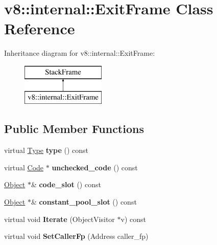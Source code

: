 \hypertarget{classv8_1_1internal_1_1_exit_frame}{}\section{v8\+:\+:internal\+:\+:Exit\+Frame Class Reference}
\label{classv8_1_1internal_1_1_exit_frame}
Inheritance diagram for v8\+:\+:internal\+:\+:Exit\+Frame\+:\begin{figure}[H]
\begin{center}
\leavevmode
\includegraphics[height=2.000000cm]{classv8_1_1internal_1_1_exit_frame}
\end{center}
\end{figure}
\subsection*{Public Member Functions}
\begin{DoxyCompactItemize}
\item 
\hypertarget{classv8_1_1internal_1_1_exit_frame_aa8e1ddd656c8fa0057a4a0a682252625}{}virtual \hyperlink{classv8_1_1internal_1_1_type_impl}{Type} {\bfseries type} () const \label{classv8_1_1internal_1_1_exit_frame_aa8e1ddd656c8fa0057a4a0a682252625}

\item 
\hypertarget{classv8_1_1internal_1_1_exit_frame_a65d3f3b3cc9a22462c134e09bad7e8b3}{}virtual \hyperlink{classv8_1_1internal_1_1_code}{Code} $\ast$ {\bfseries unchecked\+\_\+code} () const \label{classv8_1_1internal_1_1_exit_frame_a65d3f3b3cc9a22462c134e09bad7e8b3}

\item 
\hypertarget{classv8_1_1internal_1_1_exit_frame_a537e0bc85afb3cb1ca71240a519c2185}{}\hyperlink{classv8_1_1internal_1_1_object}{Object} $\ast$\& {\bfseries code\+\_\+slot} () const \label{classv8_1_1internal_1_1_exit_frame_a537e0bc85afb3cb1ca71240a519c2185}

\item 
\hypertarget{classv8_1_1internal_1_1_exit_frame_a54dbac985b8771ebd6ed590db25cb9cb}{}\hyperlink{classv8_1_1internal_1_1_object}{Object} $\ast$\& {\bfseries constant\+\_\+pool\+\_\+slot} () const \label{classv8_1_1internal_1_1_exit_frame_a54dbac985b8771ebd6ed590db25cb9cb}

\item 
\hypertarget{classv8_1_1internal_1_1_exit_frame_a8ae8ee4e21da2dba0187fea5c1f45efa}{}virtual void {\bfseries Iterate} (Object\+Visitor $\ast$v) const \label{classv8_1_1internal_1_1_exit_frame_a8ae8ee4e21da2dba0187fea5c1f45efa}

\item 
\hypertarget{classv8_1_1internal_1_1_exit_frame_a881c056c5ab5269176c1ed708227fb05}{}virtual void {\bfseries Set\+Caller\+Fp} (Address caller\+\_\+fp)\label{classv8_1_1internal_1_1_exit_frame_a881c056c5ab5269176c1ed708227fb05}

\end{DoxyCompactItemize}
